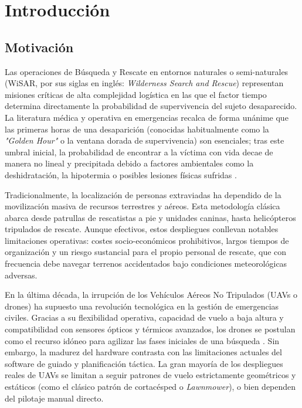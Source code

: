 \chapter{Introducción}

\section{Motivación}
Las operaciones de Búsqueda y Rescate en entornos naturales o semi-naturales (WiSAR, por sus siglas en inglés: \textit{Wilderness Search and Rescue}) representan misiones críticas de alta complejidad logística en las que el factor tiempo determina directamente la probabilidad de supervivencia del sujeto desaparecido. La literatura médica y operativa en emergencias recalca de forma unánime que las primeras horas de una desaparición (conocidas habitualmente como la \textit{"Golden Hour"} o la ventana dorada de supervivencia) son esenciales; tras este umbral inicial, la probabilidad de encontrar a la víctima con vida decae de manera no lineal y precipitada debido a factores ambientales como la deshidratación, la hipotermia o posibles lesiones físicas sufridas \cite{lyu2023}.

Tradicionalmente, la localización de personas extraviadas ha dependido de la movilización masiva de recursos terrestres y aéreos. Esta metodología clásica abarca desde patrullas de rescatistas a pie y unidades caninas, hasta helicópteros tripulados de rescate. Aunque efectivos, estos despliegues conllevan notables limitaciones operativas: costes socio-económicos prohibitivos, largos tiempos de organización y un riesgo sustancial para el propio personal de rescate, que con frecuencia debe navegar terrenos accidentados bajo condiciones meteorológicas adversas.

En la última década, la irrupción de los Vehículos Aéreos No Tripulados (UAVs o drones) ha supuesto una revolución tecnológica en la gestión de emergencias civiles. Gracias a su flexibilidad operativa, capacidad de vuelo a baja altura y compatibilidad con sensores ópticos y térmicos avanzados, los drones se postulan como el recurso idóneo para agilizar las fases iniciales de una búsqueda \cite{rahman2025}. Sin embargo, la madurez del hardware contrasta con las limitaciones actuales del software de guiado y planificación táctica. La gran mayoría de los despliegues reales de UAVs se limitan a seguir patrones de vuelo estrictamente geométricos y estáticos (como el clásico patrón de cortacésped o \textit{Lawnmower}), o bien dependen del pilotaje manual directo.


